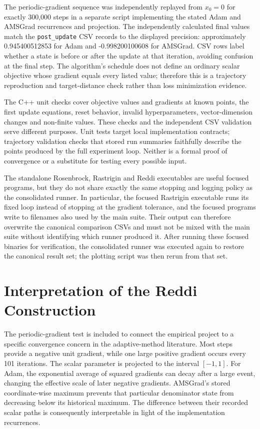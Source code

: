 \documentclass[conference]{IEEEtran}
\begin{document}
The periodic-gradient sequence was independently replayed from $x_0=0$ for exactly 300,000 steps in a separate script implementing the stated Adam and AMSGrad recurrences and projection. The independently calculated final values match the \texttt{post\_update} CSV records to the displayed precision: approximately 0.945400512853 for Adam and -0.998200100608 for AMSGrad. CSV rows label whether a state is before or after the update at that iteration, avoiding confusion at the final step. The algorithm's schedule does not define an ordinary scalar objective whose gradient equals every listed value; therefore this is a trajectory reproduction and target-distance check rather than loss minimization evidence.

The C++ unit checks cover objective values and gradients at known points, the first update equations, reset behavior, invalid hyperparameters, vector-dimension changes and non-finite values. These checks and the independent CSV validation serve different purposes. Unit tests target local implementation contracts; trajectory validation checks that stored run summaries faithfully describe the points produced by the full experiment loop. Neither is a formal proof of convergence or a substitute for testing every possible input.

The standalone Rosenbrock, Rastrigin and Reddi executables are useful focused programs, but they do not share exactly the same stopping and logging policy as the consolidated runner. In particular, the focused Rastrigin executable runs its fixed loop instead of stopping at the gradient tolerance, and the focused programs write to filenames also used by the main suite. Their output can therefore overwrite the canonical comparison CSVs and must not be mixed with the main suite without identifying which runner produced it. After running these focused binaries for verification, the consolidated runner was executed again to restore the canonical result set; the plotting script was then rerun from that set.
\section{Interpretation of the Reddi Construction}
The periodic-gradient test is included to connect the empirical project to a specific convergence concern in the adaptive-method literature. Most steps provide a negative unit gradient, while one large positive gradient occurs every 101 iterations. The scalar parameter is projected to the interval $[-1,1]$. For Adam, the exponential average of squared gradients can decay after a large event, changing the effective scale of later negative gradients. AMSGrad's stored coordinate-wise maximum prevents that particular denominator state from decreasing below its historical maximum. The difference between their recorded scalar paths is consequently interpretable in light of the implementation recurrences.
\end{document}
